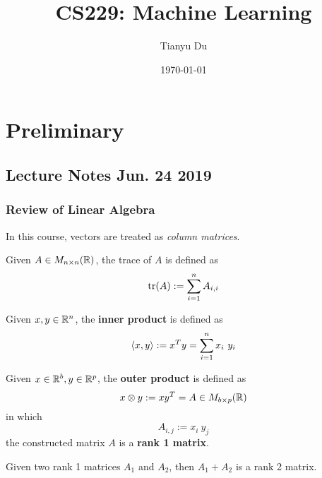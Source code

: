 \documentclass{report}
\title{CS229: Machine Learning}
\date{\today}
\author{Tianyu Du}
\begin{document}
    \maketitle
    \tableofcontents
    \chapter{Preliminary}
    \section{Lecture Notes Jun. 24 2019}
    \subsection{Review of Linear Algebra}
    
    \begin{remark}
        In this course, vectors are treated as \emph{column matrices}.
    \end{remark}
    
    \begin{definition}
        Given $A \in M_{n \times n}(\mathbb{R})$, the trace of $A$ is defined as 
        \begin{equation}
            \text{{tr}}(A) := \sum_{i=1}^n A_{i,i}
        \end{equation}
    \end{definition}

    \begin{definition}
        Given $x, y \in \mathbb{R}^n$, the \textbf{inner product} is defined as 
        \begin{equation}
            \inner{x}{y} := x^T y = \sum_{i=1}^n x_i\ y_i
        \end{equation}
    \end{definition}

    \begin{definition}
        Given $x \in \mathbb{R}^b, y \in \mathbb{R}^p$, the \textbf{outer product} is defined as 
        \begin{equation}
            x \otimes y := x y^T = A \in M_{b \times p}(\mathbb{R})
        \end{equation}
        in which
        \begin{equation}
            A_{i, j} := x_i\ y_j
        \end{equation}
        the constructed matrix $A$ is a \textbf{rank 1 matrix}.
    \end{definition}
    
    \begin{remark}
        Given two rank 1 matrices $A_1$ and $A_2$, then $A_1 + A_2$ is a rank 2 matrix.
    \end{remark}
    
\end{document}
